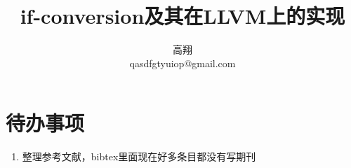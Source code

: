 \documentclass[a4paper]{article}
\begin{document}
\title{if-conversion及其在LLVM上的实现}
\author{高翔\\qasdfgtyuiop@gmail.com}

\maketitle

\tableofcontents
\setcounter{tocdepth}{3}
\newpage





\section{待办事项}
\begin{enumerate}
\item 整理参考文献，bibtex里面现在好多条目都没有写期刊
\end{enumerate}

\begin{small}


\end{small}
\end{document}
